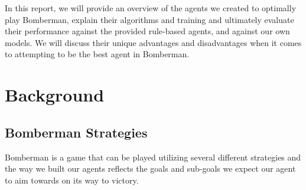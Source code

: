 \documentclass[article, 10pt]{IEEEtran}
\begin{document}
In this report, we will provide an overview of the agents we created to optimally play Bomberman, explain their algorithms and training and ultimately evaluate their performance against the provided rule-based agents, and against our own models. We will discuss their unique advantages and disadvantages when it comes to attempting to be the best agent in Bomberman.






\section{Background}\label{sec:2_background}

\subsection{Bomberman Strategies}
Bomberman is a game that can be played utilizing several different strategies and the way we built our agents reflects the goals and sub-goals we expect our agent to aim towards on its way to victory. 
\end{document}
